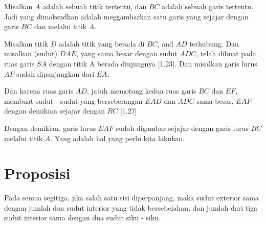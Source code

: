 \documentclass[a4paper]{book}
\begin{document}

Misalkan $A$ adalah sebuah titik tertentu, dan $BC$ adalah sebuah garis tertentu. Jadi
yang dimaksudkan adalah meggambarkan satu garis yang sejajar dengan garis $BC$ 
dan melalui titik $A$.

Misalkan titik $D$ adalah titik yang berada di $BC$, and $AD$ terhubung. 
Dan misalkan (sudut) $DAE$, yang sama besar dengan sudut $ADC$, telah dibuat 
pada ruas garis $SA$ dengan titik A berada diujungnya [1.23]. Dan misalkan garis
lurus $AF$ sudah dipanjangkan dari $EA$.

Dan karena ruas garis $AD$, jatuh memotong kedua ruas garis $BC$ dan $EF$, membuat 
sudut - sudut yang berseberangan $EAD$ dan $ADC$ sama besar, $EAF$ dengan demikian
sejajar dengan $BC$ [1.27]

Dengan demikian, garis lurus $EAF$ sudah digambar sejajar dengan garis lurus $BC$
melalui titik $A$. Yang adalah hal yang perlu kita lakukan.

\section*{\centering Proposisi \thesection} 

Pada semua segitiga, jika salah satu sisi diperpanjang, maka sudut exterior 
sama dengan jumlah dua sudut interior yang tidak bersebelahan, dan jumlah 
dari tiga sudut interior sama dengan dua sudut siku - siku.

\begin{center}
\end{center}
\end{document}

